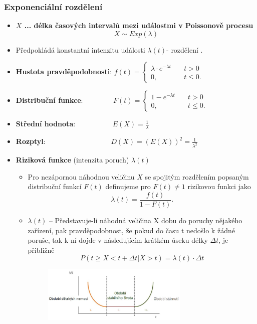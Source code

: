 \subsubsection{Exponenciální rozdělení}
\begin{itemize}
	\item \textbf{$X$ ... délka časových intervalů mezi událostmi v Poissonově procesu}
	$$X \sim Exp(\lambda)$$
	\item Předpokládá konstantní intenzitu události $\lambda(t)$- rozdělení .
	\item \textbf{Hustota pravděpodobnosti}:
	 $f(t) =	\begin{cases}
 			   \lambda \cdot e^{-\lambda t}       & \quad t > 0\\
 			   0,  & \quad t \leq 0.
 			 \end{cases}$
	\item \textbf{Distribuční funkce}:
	$\qquad\qquad F(t) =	\begin{cases}
 			   1 -  e^{-\lambda t}       & \quad t > 0\\
 			   0,  & \quad t \leq 0.
 			 \end{cases}$
	\item \textbf{Střední hodnota}: $\qquad\qquad\quad E(X) = \frac{1}{\lambda}$
	\item \textbf{Rozptyl}: $\qquad\qquad\qquad\qquad\quad D(X) = (E(X))^2 = \frac{1}{\lambda^2}$ \\
	\item \textbf{Riziková funkce} (intenzita poruch) $\lambda (t)$
	\begin{itemize}
		\item Pro nezápornou náhodnou veličinu $X$ se spojitým rozdělením popsaným distribuční funkcí $F(t)$ definujeme pro $F(t) \not= 1$ rizikovou funkci jako  $$\lambda(t) = \frac{f(t)}{1 - F(t)}.$$
		\item $\lambda(t)$ -- Představuje-li náhodná veličina X dobu do poruchy nějakého zařízení, pak pravděpodobnost, že pokud do času t nedošlo k žádné poruše, tak k ní dojde v následujícím krátkém úseku délky $\Delta t$, je přibližně 
		$$P(t \geq X <t + \Delta t|X > t) = \lambda(t) \cdot \Delta t$$
			\begin{figure}[H]
	\centering
	\includegraphics[width=0.7\textwidth]{assets/12_exp_rizk_fce}

\end{figure}
\end{itemize}
\end{itemize}
